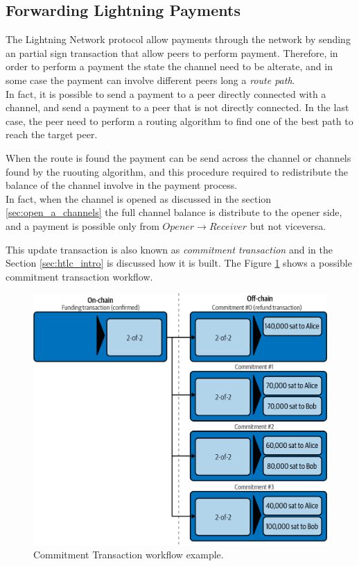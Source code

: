 \subsection{Forwarding Lightning Payments}

The Lightning Network protocol allow payments through the network by sending an partial sign transaction that
allow peers to perform payment.
Therefore, in order to perform a payment the state the channel need to be alterate, and in some case the payment can involve
different peers long a \emph{route path}.\\
In fact, it is possible to send a payment to a peer directly connected with a channel, and send a payment to a peer
that is not directly connected. In the last case, the peer need to perform a routing algorithm
to find one of the best path to reach the target peer.

When the route is found the payment can be send across the channel or channels found by the ruouting algorithm, and this procedure
required to redistribute the balance of the channel involve in the payment process.\\
In fact, when the channel is opened as discussed in the section \ref{sec:open_a_channels} the full channel balance is distribute to the opener side,
and a payment is possible only from $Opener \rightarrow Receiver$ but not viceversa.

This update transaction is also known as \emph{commitment transaction} and in the Section \ref{sec:htlc_intro} is discussed how it is built.
The Figure \ref{fig:commitment_transaction_example} shows a possible commitment transaction workflow.

\begin{figure}[h]
  \begin{center}
  \includegraphics[width=0.6\columnwidth]{imgs/mtln_0706.png}
  \end{center}
  \caption{Commitment Transaction workflow example.}
  \label{fig:commitment_transaction_example}
\end{figure}


